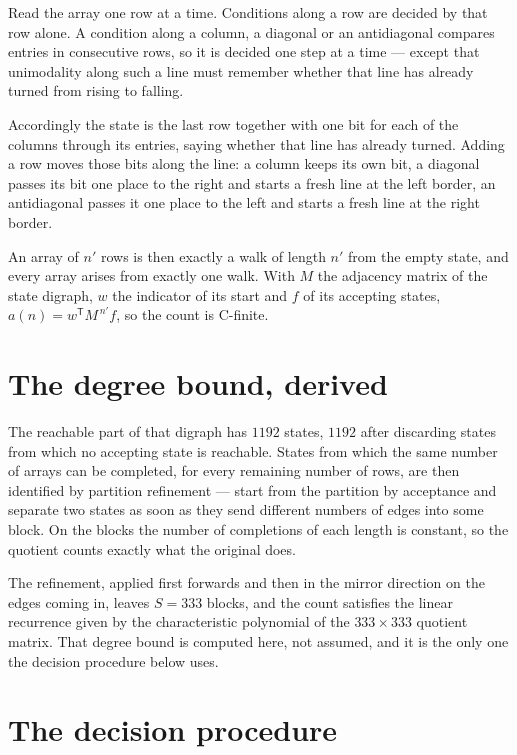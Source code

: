 \documentclass[11pt]{article}
\theoremstyle{definition}
\begin{document}
Read the array one row at a time. Conditions along a row are decided by that row alone. A condition along a column, a diagonal or an antidiagonal compares entries in consecutive rows, so it is decided one step at a time --- except that unimodality along such a line must remember whether that line has already turned from rising to falling.

Accordingly the state is the last row together with one bit for each of the columns through its entries, saying whether that line has already turned. Adding a row moves those bits along the line: a column keeps its own bit, a diagonal passes its bit one place to the right and starts a fresh line at the left border, an antidiagonal passes it one place to the left and starts a fresh line at the right border.

An array of $n'$ rows is then exactly a walk of length $n'$ from the empty state, and every array arises from exactly one walk. With $M$ the adjacency matrix of the state digraph, $w$ the indicator of its start and $f$ of its accepting states, $a(n) = w^{\mathsf T}M^{\,n'}f$, so the count is C-finite.

\section{The degree bound, derived}

The reachable part of that digraph has $1192$ states, $1192$ after discarding states from which no accepting state is reachable. States from which the same number of arrays can be completed, for every remaining number of rows, are then identified by partition refinement --- start from the partition by acceptance and separate two states as soon as they send different numbers of edges into some block. On the blocks the number of completions of each length is constant, so the quotient counts exactly what the original does.

The refinement, applied first forwards and then in the mirror direction on the edges coming in, leaves $S = 333$ blocks, and the count satisfies the linear recurrence given by the characteristic polynomial of the $333 \times 333$ quotient matrix. That degree bound is computed here, not assumed, and it is the only one the decision procedure below uses.

\section{The decision procedure}
\end{document}
